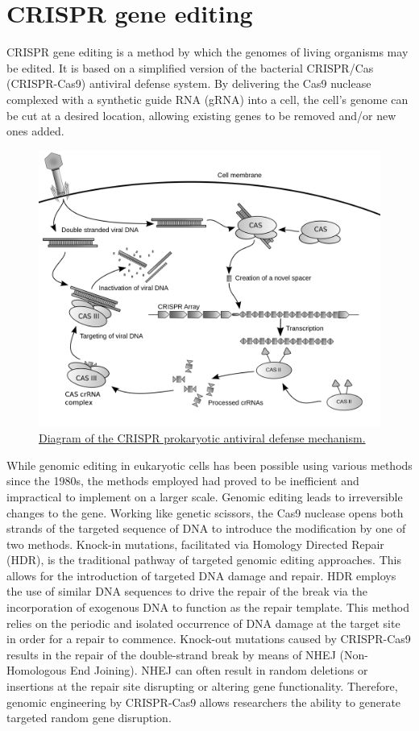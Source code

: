 \hypertarget{crispr-gene-editing}{%
\section{CRISPR gene editing}\label{crispr-gene-editing}}

CRISPR gene editing is a method by which the genomes of living organisms may be edited. It is based on a simplified version of the bacterial CRISPR/Cas (CRISPR-Cas9) antiviral defense system. By delivering the Cas9 nuclease complexed with a synthetic guide RNA (gRNA) into a cell, the cell's genome can be cut at a desired location, allowing existing genes to be removed and/or new ones added.



\begin{figure}

{\centering \includegraphics[width=0.7\linewidth]{./figures/techniques/Crispr} 

}

\caption{\href{https://commons.wikimedia.org/wiki/File:Crispr.png}{Diagram of the CRISPR prokaryotic antiviral defense mechanism.}}\label{fig:crisprdiagram}
\end{figure}

While genomic editing in eukaryotic cells has been possible using various methods since the 1980s, the methods employed had proved to be inefficient and impractical to implement on a larger scale. Genomic editing leads to irreversible changes to the gene. Working like genetic scissors, the Cas9 nuclease opens both strands of the targeted sequence of DNA to introduce the modification by one of two methods. Knock-in mutations, facilitated via Homology Directed Repair (HDR), is the traditional pathway of targeted genomic editing approaches. This allows for the introduction of targeted DNA damage and repair. HDR employs the use of similar DNA sequences to drive the repair of the break via the incorporation of exogenous DNA to function as the repair template. This method relies on the periodic and isolated occurrence of DNA damage at the target site in order for a repair to commence. Knock-out mutations caused by CRISPR-Cas9 results in the repair of the double-strand break by means of NHEJ (Non-Homologous End Joining). NHEJ can often result in random deletions or insertions at the repair site disrupting or altering gene functionality. Therefore, genomic engineering by CRISPR-Cas9 allows researchers the ability to generate targeted random gene disruption.

